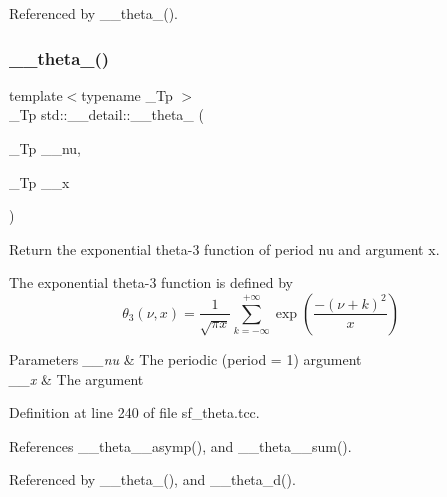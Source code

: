 Referenced by \+\_\+\+\_\+theta\+\_().

\mbox{\label{namespacestd_1_1____detail_a6f965c639307555e5979b954a11ca0b8}} 
\subsubsection{\texorpdfstring{\+\_\+\+\_\+theta\+\_()}{\_\_theta\_3()}}
{\footnotesize\ttfamily template$<$typename \+\_\+\+Tp $>$ \\
\+\_\+\+Tp std\+::\+\_\+\+\_\+detail\+::\+\_\+\+\_\+theta\+\_ (\begin{DoxyParamCaption}\item[{\+\_\+\+Tp}]{\+\_\+\+\_\+nu,  }\item[{\+\_\+\+Tp}]{\+\_\+\+\_\+x }\end{DoxyParamCaption})}

Return the exponential theta-\/3 function of period {\ttfamily nu} and argument {\ttfamily x}.

The exponential theta-\/3 function is defined by \[ \theta_3(\nu,x) = \frac{1}{\sqrt{\pi x}} \sum_{k=-\infty}^{+\infty} \exp\left( \frac{-(\nu+k)^2}{x} \right) \]


\begin{DoxyParams}{Parameters}
{\em \+\_\+\+\_\+nu} & The periodic (period = 1) argument \\
\hline
{\em \+\_\+\+\_\+x} & The argument \\
\hline
\end{DoxyParams}


Definition at line 240 of file sf\+\_\+theta.\+tcc.



References \+\_\+\+\_\+theta\+\_\+\_\+asymp(), and \+\_\+\+\_\+theta\+\_\+\_\+sum().



Referenced by \+\_\+\+\_\+theta\+\_(), and \+\_\+\+\_\+theta\+\_\+d().

\mbox{\label{namespacestd_1_1____detail_a975a9a52a8a483849dd0877c24ca5d74}} 
